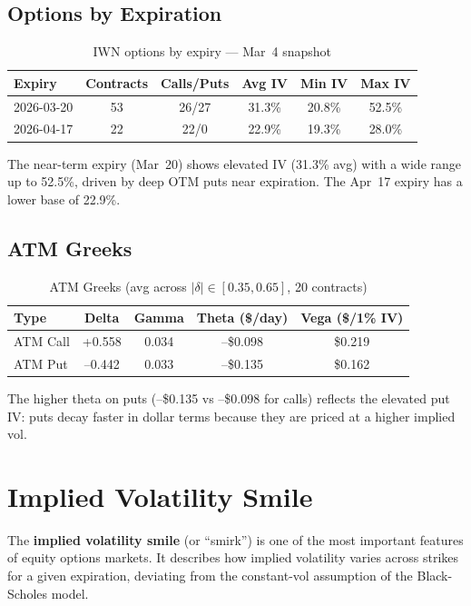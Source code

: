 \documentclass[11pt,letterpaper]{article}
\begin{document}
\subsection{Options by Expiration}

\begin{table}[H]
\centering
\caption{IWN options by expiry --- Mar~4 snapshot}
\begin{tabular}{lccccc}
\toprule
Expiry & Contracts & Calls/Puts & Avg IV & Min IV & Max IV \\
\midrule
2026-03-20 & 53 & 26/27 & 31.3\% & 20.8\% & 52.5\% \\
2026-04-17 & 22 & 22/0  & 22.9\% & 19.3\% & 28.0\% \\
\bottomrule
\end{tabular}
\end{table}

The near-term expiry (Mar~20) shows elevated IV (31.3\% avg) with a wide
range up to 52.5\%, driven by deep OTM puts near expiration. The Apr~17
expiry has a lower base of 22.9\%.

\subsection{ATM Greeks}

\begin{table}[H]
\centering
\caption{ATM Greeks (avg across $|\delta| \in [0.35, 0.65]$, 20 contracts)}
\begin{tabular}{lcccc}
\toprule
Type & Delta & Gamma & Theta (\$/day) & Vega (\$/1\% IV) \\
\midrule
ATM Call & +0.558 & 0.034 & --\$0.098 & \$0.219 \\
ATM Put  & --0.442 & 0.033 & --\$0.135 & \$0.162 \\
\bottomrule
\end{tabular}
\end{table}

\noindent
The higher theta on puts (--\$0.135 vs --\$0.098 for calls) reflects the
elevated put IV: puts decay faster in dollar terms because they are priced
at a higher implied vol.

\section{Implied Volatility Smile}

The \textbf{implied volatility smile} (or ``smirk'') is one of the most
important features of equity options markets. It describes how implied
volatility varies across strikes for a given expiration, deviating from the
constant-vol assumption of the Black-Scholes model.
\end{document}
